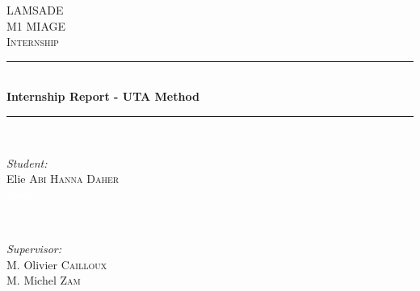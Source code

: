 \documentclass{report}
\begin{document}


\begin{titlepage}

\newcommand{\HRule}{\rule{\linewidth}{0.5mm}}
\center

\textsc{\LARGE LAMSADE}\\[1.5cm] 
\textsc{\Large M1 MIAGE}\\[0.5cm]
\textsc{\large Internship}\\[0.5cm] 

\HRule \\[0.4cm]
{ \huge \bfseries Internship Report - UTA Method} 
\HRule \\[1.5cm]

\begin{minipage}{0.4\textwidth}
\begin{flushleft} \large
\emph{Student:}\\
Elie \textsc{Abi Hanna Daher}\\ 
\textcolor{white}{blank space}
\end{flushleft}
\end{minipage}
~
\begin{minipage}{0.4\textwidth}
\begin{flushright} \large
\emph{Supervisor:} \\
M. Olivier \textsc{Cailloux} \\
M. Michel \textsc{Zam} 
\end{flushright}
\end{minipage}\\[2cm]

\newcommand{\mydate}{}
{\large \mydate}\\[2cm] 

\begin{figure}[h]
\\[0.5cm]
\end{figure}

\vfill

\end{titlepage}
\end{document}
